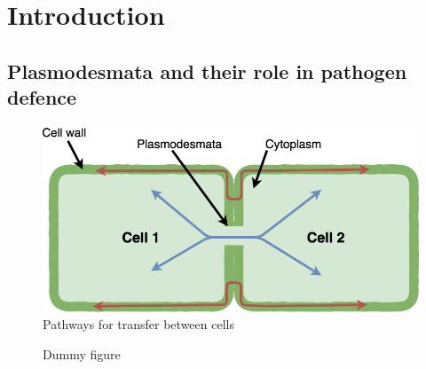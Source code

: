 \documentclass[../main.tex]{subfiles}
\begin{document}
\chapter{Introduction}
\label{cha:introduction}


\section{Plasmodesmata and their role in pathogen defence}
\label{sec:plasmodesmata}

\begin{figure}[ht]
  \centering
  \includegraphics[width=0.5\columnwidth]{./figures/sympast+apoplast.png}
  \caption{\label{fig:pathways} Pathways for transfer between cells}
\end{figure}


\begin{figure}[!ht]
     \hfill
     \caption{Dummy figure}
     \label{fig:dummy}
   \end{figure}
\end{document}

